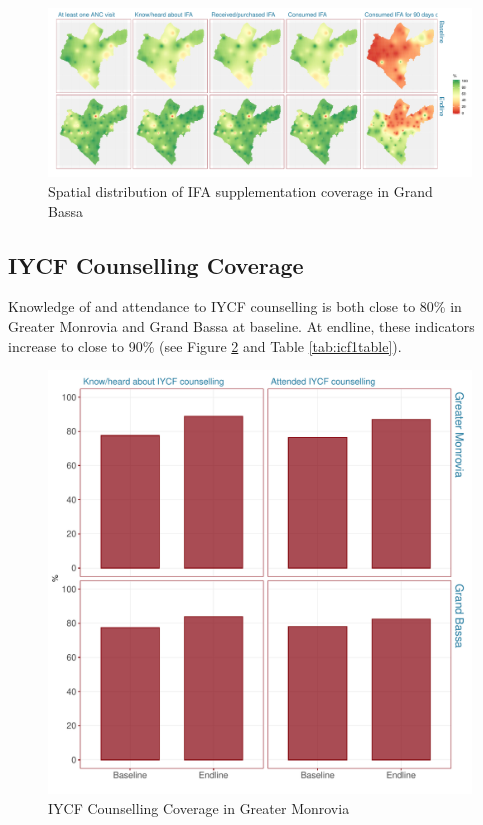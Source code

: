 \documentclass[12pt,a4paper]{article}
\begin{document}
\begin{figure}[H]

{\centering \includegraphics{liberiaCoverageFinalReport_files/figure-latex/ifa2Map-1} 

}

\caption{Spatial distribution of IFA supplementation coverage in Grand Bassa}\label{fig:ifa2Map}
\end{figure}

\newpage

\hypertarget{iycf-counselling-coverage}{%
\subsection{IYCF Counselling Coverage}\label{iycf-counselling-coverage}}

Knowledge of and attendance to IYCF counselling is both close to 80\% in Greater Monrovia and Grand Bassa at baseline. At endline, these indicators increase to close to 90\% (see Figure \ref{fig:icf1plot} and Table \ref{tab:icf1table}).

\begin{figure}[H]

{\centering \includegraphics{liberiaCoverageFinalReport_files/figure-latex/icf1plot-1} 

}

\caption{IYCF Counselling Coverage in Greater Monrovia}\label{fig:icf1plot}
\end{figure}
\end{document}
